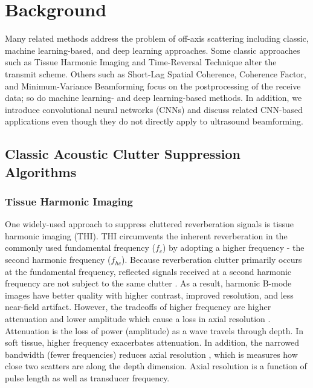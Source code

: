 \chapter{Background}

  Many related methods address the problem of off-axis scattering including classic, machine learning-based, and deep learning approaches. Some classic approaches such as Tissue Harmonic Imaging and Time-Reversal Technique alter the transmit scheme. Others such as Short-Lag Spatial Coherence, Coherence Factor, and Minimum-Variance Beamforming focus on the postprocessing of the receive data; so do machine learning- and deep learning-based methods. In addition, we introduce convolutional neural networks (CNNs) and discuss related CNN-based applications even though they do not directly apply to ultrasound beamforming.

  \section{Classic Acoustic Clutter Suppression Algorithms} %
    \subsection{Tissue Harmonic Imaging}
      One widely-used approach to suppress cluttered reverberation signals is tissue harmonic imaging (THI). THI circumvents the inherent reverberation in the commonly used fundamental frequency ($f_{c}$) by adopting a higher frequency - the second harmonic frequency ($f_{hc}$). Because reverberation clutter primarily occurs at the fundamental frequency, reflected signals received at a second harmonic frequency are not subject to the same clutter \cite{christopher1997finite, ward1997nonlinear, averkiou1997nonlinear}. As a result, harmonic B-mode images have better quality with higher contrast, improved resolution, and less near-field artifact. However, the tradeoffs of higher frequency are higher attenuation and lower amplitude which cause a loss in axial resolution \cite{muir1980prediction, starritt1986development, humphrey2000nonlinear, cobbold2006foundations, anvari2015primer}. Attenuation is the loss of power (amplitude) as a wave travels through depth. In soft tissue, higher frequency exacerbates attenuation. In addition, the narrowed bandwidth (fewer frequencies) reduces axial resolution \cite{whittingham1999tissue}, which is measures how close two scatters are along the depth dimension. Axial resolution is a function of pulse length as well as transducer frequency.

